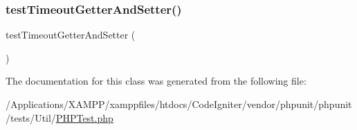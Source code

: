 \mbox{\label{class_p_h_p_unit___util___p_h_p_test_a3b15593a3e2da9f40823c666349b1538}} 
\subsubsection{\texorpdfstring{test\+Timeout\+Getter\+And\+Setter()}{testTimeoutGetterAndSetter()}}
{\footnotesize\ttfamily test\+Timeout\+Getter\+And\+Setter (\begin{DoxyParamCaption}{ }\end{DoxyParamCaption})}



The documentation for this class was generated from the following file\+:\begin{DoxyCompactItemize}
\item 
/\+Applications/\+X\+A\+M\+P\+P/xamppfiles/htdocs/\+Code\+Igniter/vendor/phpunit/phpunit/tests/\+Util/\mbox{\hyperlink{_p_h_p_test_8php}{P\+H\+P\+Test.\+php}}\end{DoxyCompactItemize}
